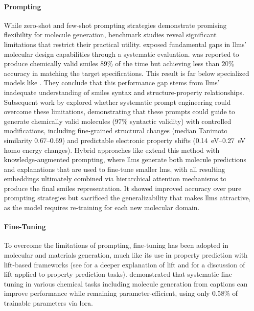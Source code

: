\paragraph{Prompting}
While zero-shot and few-shot prompting strategies demonstrate promising flexibility for molecule generation, benchmark studies \autocite{guo2023large} reveal significant limitations that restrict their practical utility. \textcite{guo2023large} exposed fundamental gaps in \glspl{llm}' molecular design capabilities through a systematic evaluation.  was reported to produce chemically valid \gls{smiles} $89\%$ of the time but achieving less than $20\%$ accuracy in matching the target specifications. 
This result is far below specialized models like \autocite{edwards2022translation}. 
They conclude that this performance gap stems from \glspl{llm}' inadequate understanding of \gls{smiles} syntax and structure-property relationships. 
Subsequent work by \textcite{bhattacharya2024large} explored whether systematic prompt engineering could overcome these limitations, demonstrating that these prompts could guide  to generate chemically valid molecules ($97\%$ syntactic validity) with controlled modifications, including fine-grained structural changes (median Tanimoto similarity $0.67$--$0.69$) and predictable electronic property shifts (\SIrange{0.14}{0.27}{eV} \gls{homo} energy changes). Hybrid approaches like  extend this method with knowledge-augmented prompting, where \glspl{llm} generate both molecule predictions and explanations that are used to fine-tune smaller \glspl{lm}, with all resulting embeddings ultimately combined via hierarchical attention mechanisms to produce the final \gls{smiles} representation\autocite{srinivas2024crossing}. 
It showed improved accuracy over pure prompting strategies but sacrificed the generalizability that makes \glspl{llm} attractive, as the model requires re-training for each new molecular domain. 

\paragraph{Fine-Tuning} To overcome the limitations of prompting, fine-tuning has been adopted in molecular and materials generation, much like its use in property prediction with \gls{lift}-based frameworks (see  for a deeper explanation of \gls{lift} and  for a discussion of \gls{lift} applied to property prediction tasks). \textcite{yu2024llasmol} demonstrated that systematic fine-tuning in various chemical tasks including molecule generation from captions can improve performance while remaining parameter-efficient, using only $0.58\%$ of trainable parameters via \gls{lora}.

